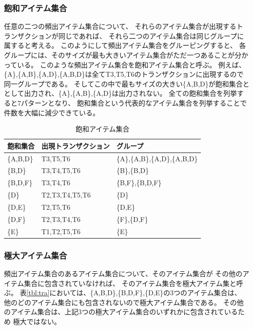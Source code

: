 \documentclass[a4paper]{jarticle}
\begin{document}
\subsubsection*{飽和アイテム集合}
任意の二つの頻出アイテム集合について、
それらのアイテム集合が出現するトランザクションが同じであれば、
それら二つのアイテム集合は同じグループに属すると考える。
このようにして頻出アイテム集合をグルーピングすると、
各グループには、そのサイズが最も大きいアイテム集合がただ一つあることが分かっている。
このような頻出アイテム集合を飽和アイテム集合と呼ぶ。
例えば、\{A\},\{A,B\},\{A,D\},\{A,B,D\}は全てT3,T5,T6のトランザクションに出現するので同一グループである。
そしてこの中で最もサイズの大きい\{A,B,D\}が飽和集合ととして出力され、\{A\},\{A,B\},\{A,D\}は出力されない。
全ての飽和集合を列挙すると7パターンとなり、
飽和集合という代表的なアイテム集合を列挙することで件数を大幅に減少できている。

\begin{table}[htbp]
\begin{center}

\caption{飽和アイテム集合\label{tbl:close}}
{\small
\begin{tabular}{lll}
\hline
飽和集合&出現トランザクション&グループ \\
\hline
\{A,B,D\} & T3,T5,T6       & \{A\},\{A,B\},\{A,D\},\{A,B,D\} \\
\{B,D\}   & T3,T4,T5,T6    & \{B\},\{B,D\}  \\
\{B,D,F\} & T3,T4,T6       & \{B,F\},\{B,D,F\} \\
\{D\}     & T2,T3,T4,T5,T6 & \{D\} \\
\{D,E\}   & T2,T5,T6       & \{D,E\}    \\
\{D,F\}   & T2,T3,T4,T6    & \{F\},\{D,F\} \\
\{E\}     & T1,T2,T5,T6    & \{E\} \\ \hline
\end{tabular} 
}

\end{center}
\end{table} 

\subsubsection*{極大アイテム集合}
頻出アイテム集合のあるアイテム集合について、そのアイテム集合が
その他のアイテム集合に包含されていなければ、
そのアイテム集合を極大アイテム集と呼ぶ。
表\ref{tbl:tra}においては、\{A,B,D\},\{B,D,F\},\{D,E\}の3つのアイテム集合は、
他のどのアイテム集合にも包含されないので極大アイテム集合である。
その他のアイテム集合は、上記3つの極大アイテム集合のいずれかに包含されているため
極大ではない。
\end{document}
